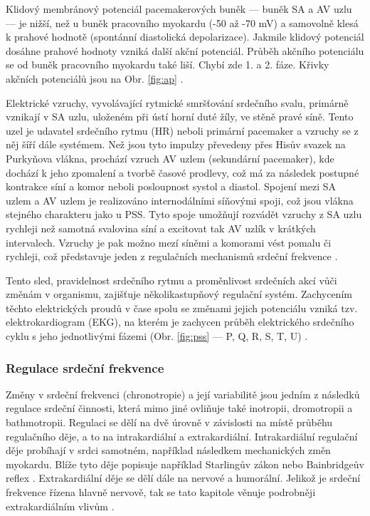 Klidový membránový potenciál pacemakerových buněk --- buněk SA a AV uzlu --- je
nižší, než u buněk pracovního myokardu (-50 až -70 mV) a samovolně klesá k
prahové hodnotě (spontánní diastolická depolarizace). Jakmile klidový potenciál
dosáhne prahové hodnoty vzniká další akční potenciál. Průběh akčního potenciálu
se od buněk pracovního myokardu také liší. Chybí zde 1. a 2. fáze. Křivky
akčních potenciálů jsou na Obr. \ref{fig:ap} \cite{Petrek2019}.

Elektrické vzruchy, vyvolávající rytmické smršťování srdečního svalu, primárně
vznikají v SA uzlu, uloženém při ústí horní duté žíly, ve stěně pravé síně.
Tento uzel je udavatel srdečního rytmu (HR) neboli primární pacemaker a vzruchy se z
něj šíří dále systémem. Než jsou tyto impulzy převedeny přes Hisův svazek na
Purkyňova vlákna, prochází vzruch AV uzlem (sekundární pacemaker), kde dochází k
jeho zpomalení a tvorbě časové prodlevy, což má za následek postupné kontrakce
síní a komor neboli posloupnost systol a diastol. Spojení mezi SA uzlem a AV
uzlem je realizováno internodálními síňovými spoji, což jsou vlákna stejného
charakteru jako u PSS. Tyto spoje umožňují rozvádět vzruchy z SA uzlu rychleji
než samotná svalovina síní a excitovat tak AV uzlík v krátkých intervalech.
Vzruchy je pak možno mezí síněmi a komorami vést pomalu či rychleji, což
představuje jeden z regulačních mechanismů srdeční frekvence
\cite{Dylevsky2013,Cihak2016}.

Tento sled, pravidelnost srdečního rytmu a proměnlivost srdečních akcí vůči
změnám v organismu, zajišťuje několikastupňový regulační systém. Zachycením
těchto elektrických proudů v čase spolu se změnami jejich potenciálu vzniká tzv.
elektrokardiogram (EKG), na kterém je zachycen průběh elektrického srdečního
cyklu s jeho jednotlivými fázemi (Obr. \ref{fig:pss} --- P, Q, R, S, T, U)
\cite{Dylevsky2013,Cihak2016}.


\subsubsection{Regulace srdeční frekvence}
\label{section:hr_regulation}
Změny v srdeční frekvenci (chronotropie) a její variabilitě jsou jedním z
následků regulace srdeční činnosti, která mimo jiné ovliňuje také inotropii,
dromotropii a bathmotropii. Regulaci se dělí na dvě úrovně v závislosti na místě
průběhu regulačního děje, a to na intrakardiální a extrakardiální.
Intrakardiální regulační děje probíhají v srdci samotném, například následkem
mechanických změn myokardu. Blíže tyto děje popisuje například Starlingův zákon
nebo Bainbridgeův reflex \cite{Kittnar2020}. Extrakardiální děje se dělí dále na
nervové a humorální. Jelikož je srdeční frekvence řízena hlavně nervově, tak se
tato kapitole věnuje podrobněji extrakardiálním vlivům \cite{Orel2019}.

